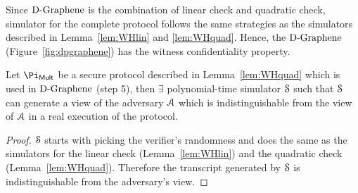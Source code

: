 Since $\text{D-Graphene}$ is the combination of linear check and quadratic check, simulator for the complete protocol follows the same strategies as the simulators described in Lemma~\ref{lem:WHlin} and \ref{lem:WHquad}. Hence, the $\text{D-Graphene}$ (Figure~\ref{fig:dpgraphene}) has the witness confidentiality property.

\begin{lemma}
	Let $\Pi_{\sf Mult}$ be a secure protocol described in Lemma~\ref{lem:WHquad} which is used in $\text{D-Graphene}$ (step 5), then $\exists$ polynomial-time simulator $\mathcal{S}$ such that $\mathcal{S}$ can generate a view of the adversary $\mathcal{A}$ which is indistinguishable from the view of $\mathcal{A}$ in a real execution of the protocol.
\end{lemma}

\begin{proof}
	$\mathcal{S}$ starts with picking the verifier's randomness and does the same as the simulators for the linear check (Lemma~\ref{lem:WHlin}) and the quadratic check (Lemma~\ref{lem:WHquad}). Therefore the transcript generated by $\mathcal{S}$ is indistinguishable from the adversary's view.
\end{proof}
